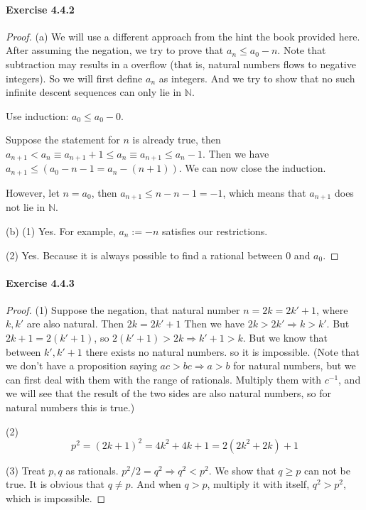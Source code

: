 \paragraph{Exercise 4.4.2} \label{exercise4.4.2}
\begin{proof}
(a) We will use a different approach from the hint the book provided here. After assuming the negation, we 
try to prove that 
$a_n \leq a_0 -n$. Note that subtraction may results in a overflow (that is, natural numbers flows to negative 
integers). So we will first define $a_n$ as integers. And we try to show that no such infinite descent 
sequences can only lie in  $\mathbb{N}$.

Use induction: $a_0 \leq a_0-0$.

Suppose the statement for $n$ is already true, then 
$a_{n+1} < a_n \equiv a_{n+1} +1 \leq a_n \equiv a_{n+1} \leq a_n - 1$. Then we have 
$a_{n+1} \leq (a_0 -n -1 = a_n -(n+1))$. We can now close the induction.

However, let $n = a_0$, then $a_{n+1} \leq n-n-1 = -1$, which means that $a_{n+1}$ does not lie in 
$\mathbb{N}$.

(b)
(1) Yes. For example, $a_n:=-n$ satisfies our restrictions.

(2) Yes. Because it is always possible to find a rational between $0$ and $a_0$.
\end{proof}

\paragraph{Exercise 4.4.3} \label{exercise4.4.3}
\begin{proof}
(1) Suppose the negation, that natural number $n=2k=2k'+1$, where $k,k'$ are also natural. Then $2k=2k'+1$
Then we have $2k > 2k' \Longrightarrow k>k'$. But $2k+1 = 2(k'+1)$, so $2(k'+1) > 2k \Longrightarrow k'+1 >k$. 
But we know that between $k',k'+1$ there exists no natural numbers. so it is impossible. (Note that we don't 
have a proposition saying $ac>bc \Longrightarrow a>b$ for natural numbers, but we can first deal with them with 
the range of rationals. Multiply them with $c^{-1}$, and we will see that the result of the two sides are also 
natural numbers, so for natural numbers this is true.)

(2)
\[
p^2 = (2k+1)^2 = 4k^2+4k + 1 = 2(2k^2+2k) +1
\]

(3)
Treat $p,q$ as rationals.
$p^2/2=q^2 \Longrightarrow q^2<p^2$. We show that $q \geq p$ can not be true. It is obvious that $q \neq p$. 
And when $q>p$, multiply it with itself, $q^2>p^2$, which is impossible.
\end{proof}